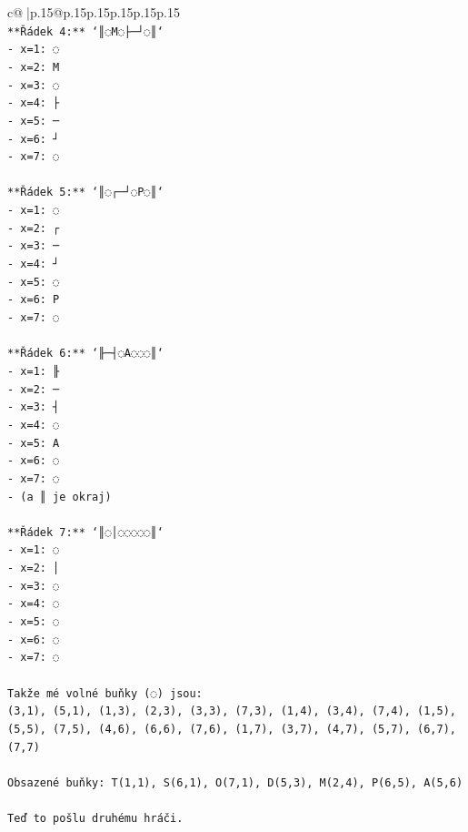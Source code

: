 \documentclass{article}
\begin{document}
{\begin{supertabular}{c@{$\;$}|p{.15\linewidth}@{}p{.15\linewidth}p{.15\linewidth}p{.15\linewidth}p{.15\linewidth}p{.15\linewidth}}
{{{\\ 
\texttt{**Řádek 4:** `║◌M◌├─┘◌║`} \\
\texttt{{-} x=1: ◌} \\
\texttt{{-} x=2: M} \\
\texttt{{-} x=3: ◌} \\
\texttt{{-} x=4: ├} \\
\texttt{{-} x=5: ─} \\
\texttt{{-} x=6: ┘} \\
\texttt{{-} x=7: ◌} \\
\\ 
\texttt{**Řádek 5:** `║◌┌─┘◌P◌║`} \\
\texttt{{-} x=1: ◌} \\
\texttt{{-} x=2: ┌} \\
\texttt{{-} x=3: ─} \\
\texttt{{-} x=4: ┘} \\
\texttt{{-} x=5: ◌} \\
\texttt{{-} x=6: P} \\
\texttt{{-} x=7: ◌} \\
\\ 
\texttt{**Řádek 6:** `╟─┤◌A◌◌◌║`} \\
\texttt{{-} x=1: ╟} \\
\texttt{{-} x=2: ─} \\
\texttt{{-} x=3: ┤} \\
\texttt{{-} x=4: ◌} \\
\texttt{{-} x=5: A} \\
\texttt{{-} x=6: ◌} \\
\texttt{{-} x=7: ◌} \\
\texttt{{-} (a ║ je okraj)} \\
\\ 
\texttt{**Řádek 7:** `║◌│◌◌◌◌◌║`} \\
\texttt{{-} x=1: ◌} \\
\texttt{{-} x=2: │} \\
\texttt{{-} x=3: ◌} \\
\texttt{{-} x=4: ◌} \\
\texttt{{-} x=5: ◌} \\
\texttt{{-} x=6: ◌} \\
\texttt{{-} x=7: ◌} \\
\\ 
\texttt{Takže mé volné buňky (◌) jsou:} \\
\texttt{(3,1), (5,1), (1,3), (2,3), (3,3), (7,3), (1,4), (3,4), (7,4), (1,5), (5,5), (7,5), (4,6), (6,6), (7,6), (1,7), (3,7), (4,7), (5,7), (6,7), (7,7)} \\
\\ 
\texttt{Obsazené buňky: T(1,1), S(6,1), O(7,1), D(5,3), M(2,4), P(6,5), A(5,6)} \\
\\ 
\texttt{Teď to pošlu druhému hráči.} \\
            }
        }
    }
     \\ \\


\end{supertabular}}
\end{document}
